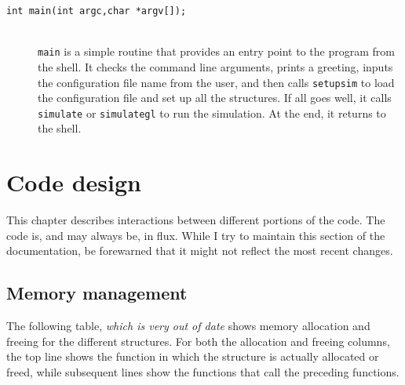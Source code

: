 \documentclass {book}
\begin{document}
\begin{description}

\item[\texttt{int main(int argc,char *argv[]);}]
\hfill \\
\texttt{main} is a simple routine that provides an entry point to the program from the shell.  It checks the command line arguments, prints a greeting, inputs the configuration file name from the user, and then calls \texttt{setupsim} to load the configuration file and set up all the structures.  If all goes well, it calls \texttt{simulate} or \texttt{simulategl} to run the simulation.  At the end, it returns to the shell.

\end{description}

\chapter{Code design}

This chapter describes interactions between different portions of the code.  The code is, and may always be, in flux.  While I try to maintain this section of the documentation, be forewarned that it might not reflect the most recent changes.

\section{Memory management}

The following table, \emph{which is very out of date} shows memory allocation and freeing for the different structures.  For both the allocation and freeing columns, the top line shows the function in which the structure is actually allocated or freed, while subsequent lines show the functions that call the preceding functions.
\end{document}
